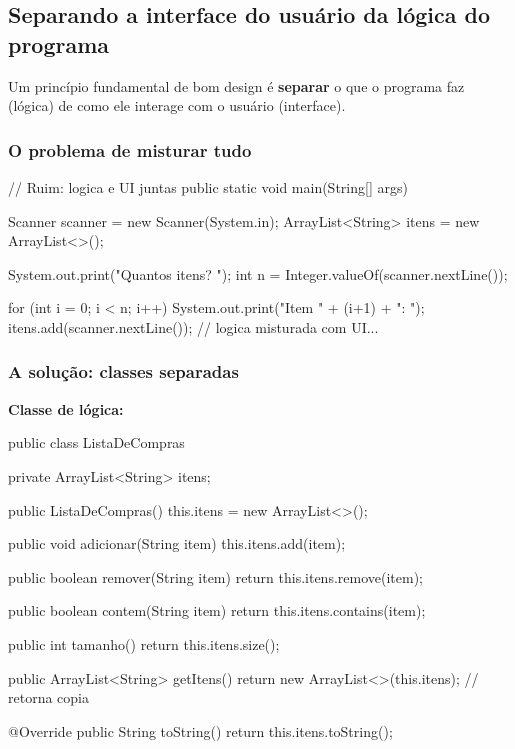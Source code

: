 \documentclass[11pt,a4paper]{article}
\begin{document}
\subsection{Separando a interface do usuário da lógica do programa}

Um princípio fundamental de bom design é \textbf{separar} o que o programa faz (lógica) de como ele interage com o usuário (interface).

\subsubsection{O problema de misturar tudo}

\begin{javacode}
// Ruim: logica e UI juntas
public static void main(String[] args) {
    Scanner scanner = new Scanner(System.in);
    ArrayList<String> itens = new ArrayList<>();

    System.out.print("Quantos itens? ");
    int n = Integer.valueOf(scanner.nextLine());

    for (int i = 0; i < n; i++) {
        System.out.print("Item " + (i+1) + ": ");
        itens.add(scanner.nextLine());
    }
    // logica misturada com UI...
}
\end{javacode}

\subsubsection{A solução: classes separadas}

\textbf{Classe de lógica:}

\begin{javacode}
public class ListaDeCompras {
    private ArrayList<String> itens;

    public ListaDeCompras() {
        this.itens = new ArrayList<>();
    }

    public void adicionar(String item) {
        this.itens.add(item);
    }

    public boolean remover(String item) {
        return this.itens.remove(item);
    }

    public boolean contem(String item) {
        return this.itens.contains(item);
    }

    public int tamanho() {
        return this.itens.size();
    }

    public ArrayList<String> getItens() {
        return new ArrayList<>(this.itens); // retorna copia
    }

    @Override
    public String toString() {
        return this.itens.toString();
    }
}
\end{javacode}
\end{document}

